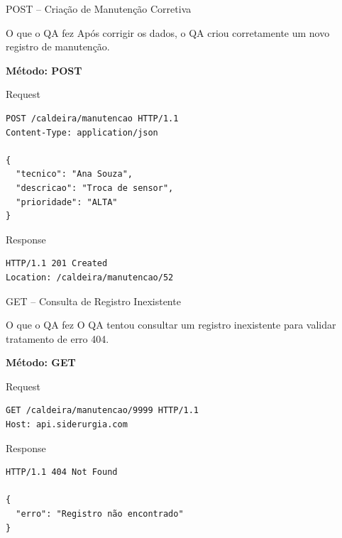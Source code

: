 \documentclass[9pt]{beamer}
\begin{document}
\begin{frame}[fragile]{POST – Criação de Manutenção Corretiva}

\begin{block}{O que o QA fez}
Após corrigir os dados, o QA criou corretamente
um novo registro de manutenção.
\end{block}

\textbf{Método: POST}

\begin{block}{Request}
\begin{verbatim}
POST /caldeira/manutencao HTTP/1.1
Content-Type: application/json

{
  "tecnico": "Ana Souza",
  "descricao": "Troca de sensor",
  "prioridade": "ALTA"
}
\end{verbatim}
\end{block}

\begin{block}{Response}
\begin{verbatim}
HTTP/1.1 201 Created
Location: /caldeira/manutencao/52
\end{verbatim}
\end{block}

\end{frame}
\begin{frame}[fragile]{GET – Consulta de Registro Inexistente}

\begin{block}{O que o QA fez}
O QA tentou consultar um registro inexistente
para validar tratamento de erro 404.
\end{block}

\textbf{Método: GET}

\begin{block}{Request}
\begin{verbatim}
GET /caldeira/manutencao/9999 HTTP/1.1
Host: api.siderurgia.com
\end{verbatim}
\end{block}

\begin{block}{Response}
\begin{verbatim}
HTTP/1.1 404 Not Found

{
  "erro": "Registro não encontrado"
}
\end{verbatim}
\end{block}

\end{frame}
\end{document}
